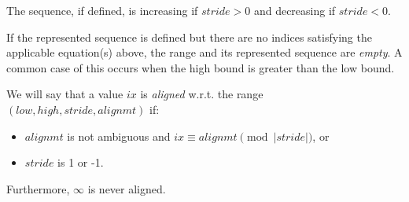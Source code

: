 The sequence, if defined, is increasing if $stride > 0$ and decreasing if $stride < 0$.

If the represented sequence is defined but
there are no indices satisfying the applicable equation(s) above,
the range and its represented sequence are \emph{empty}.  A common
case of this occurs when the high bound is greater than the low
bound.

We will say that a value $ix$ is \emph{aligned}
w.r.t. the range $(low, high, stride, alignmt)$
if:
\begin{itemize}
\item $alignmt$ is not ambiguous and $ix \equiv alignmt \pmod{|stride|}$, or
\item $stride$ is 1 or -1.
\end{itemize}
\noindent Furthermore, $\infty$ is never aligned.


